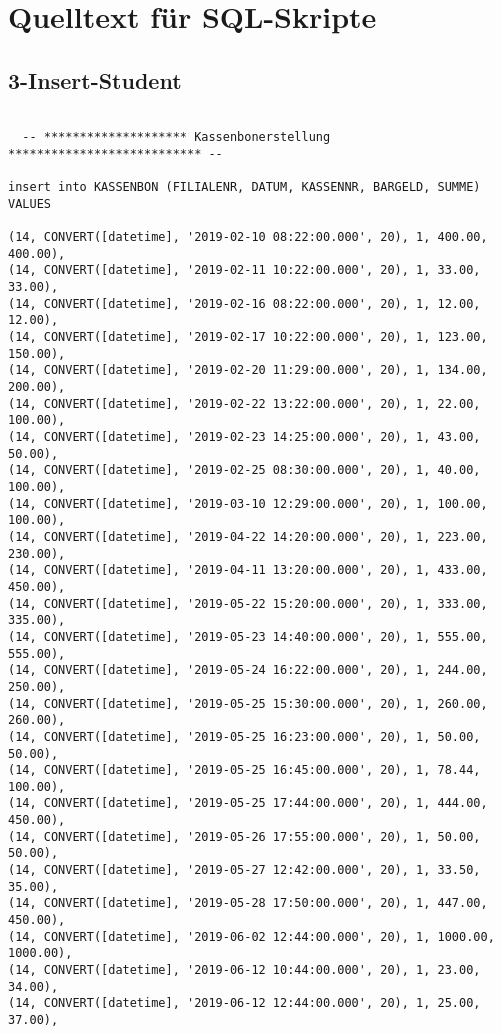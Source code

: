 \section{Quelltext für SQL-Skripte}

\subsection{3-Insert-Student}

\begin{lstlisting}

  -- ******************** Kassenbonerstellung *************************** --

insert into KASSENBON (FILIALENR, DATUM, KASSENNR, BARGELD, SUMME)
VALUES

(14, CONVERT([datetime], '2019-02-10 08:22:00.000', 20), 1, 400.00, 400.00),
(14, CONVERT([datetime], '2019-02-11 10:22:00.000', 20), 1, 33.00, 33.00),
(14, CONVERT([datetime], '2019-02-16 08:22:00.000', 20), 1, 12.00, 12.00),
(14, CONVERT([datetime], '2019-02-17 10:22:00.000', 20), 1, 123.00, 150.00),
(14, CONVERT([datetime], '2019-02-20 11:29:00.000', 20), 1, 134.00, 200.00),
(14, CONVERT([datetime], '2019-02-22 13:22:00.000', 20), 1, 22.00, 100.00),
(14, CONVERT([datetime], '2019-02-23 14:25:00.000', 20), 1, 43.00, 50.00),
(14, CONVERT([datetime], '2019-02-25 08:30:00.000', 20), 1, 40.00, 100.00),
(14, CONVERT([datetime], '2019-03-10 12:29:00.000', 20), 1, 100.00, 100.00),
(14, CONVERT([datetime], '2019-04-22 14:20:00.000', 20), 1, 223.00, 230.00),
(14, CONVERT([datetime], '2019-04-11 13:20:00.000', 20), 1, 433.00, 450.00),
(14, CONVERT([datetime], '2019-05-22 15:20:00.000', 20), 1, 333.00, 335.00),
(14, CONVERT([datetime], '2019-05-23 14:40:00.000', 20), 1, 555.00, 555.00),
(14, CONVERT([datetime], '2019-05-24 16:22:00.000', 20), 1, 244.00, 250.00),
(14, CONVERT([datetime], '2019-05-25 15:30:00.000', 20), 1, 260.00, 260.00),
(14, CONVERT([datetime], '2019-05-25 16:23:00.000', 20), 1, 50.00, 50.00),
(14, CONVERT([datetime], '2019-05-25 16:45:00.000', 20), 1, 78.44, 100.00),
(14, CONVERT([datetime], '2019-05-25 17:44:00.000', 20), 1, 444.00, 450.00),
(14, CONVERT([datetime], '2019-05-26 17:55:00.000', 20), 1, 50.00, 50.00),
(14, CONVERT([datetime], '2019-05-27 12:42:00.000', 20), 1, 33.50, 35.00),
(14, CONVERT([datetime], '2019-05-28 17:50:00.000', 20), 1, 447.00, 450.00),
(14, CONVERT([datetime], '2019-06-02 12:44:00.000', 20), 1, 1000.00, 1000.00),
(14, CONVERT([datetime], '2019-06-12 10:44:00.000', 20), 1, 23.00, 34.00),
(14, CONVERT([datetime], '2019-06-12 12:44:00.000', 20), 1, 25.00, 37.00),

\end{lstlisting}
